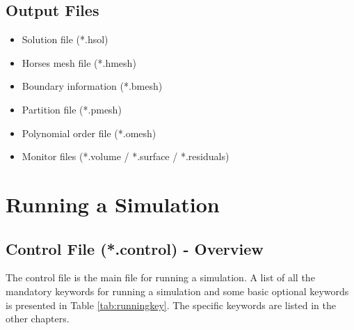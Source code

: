 \documentclass[a4paper,10pt]{report}
\begin{document}
\section{Output Files}
\begin{itemize}
\item Solution file (*.hsol)
\item Horses mesh file (*.hmesh)
\item Boundary information (*.bmesh)
\item Partition file (*.pmesh)
\item Polynomial order file (*.omesh)
\item Monitor files (*.volume / *.surface / *.residuals)
\end{itemize}

\chapter{Running a Simulation}

\section{Control File (*.control) - Overview}
The control file is the main file for running a simulation. A list of all the mandatory keywords for running a simulation and some basic optional keywords is presented in Table \ref{tab:runningkey}. The specific keywords are listed in the other chapters.
\end{document}

